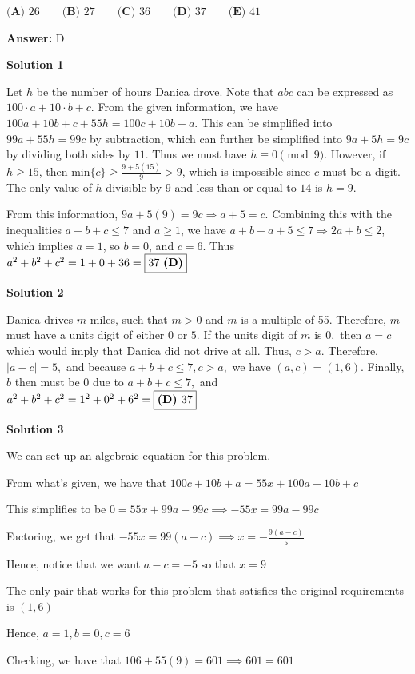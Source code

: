 \begin{enumerate}
 $\textbf {(A) } 26 \qquad \textbf {(B) } 27 \qquad \textbf {(C) } 36 \qquad \textbf {(D) } 37 \qquad \textbf {(E) }41$

 \textbf{Answer: }D



\textbf{Solution 1}

Let $h$ be the number of hours Danica drove. Note that $abc$ can be expressed as $100\cdot a+10\cdot b+c$. From the given information, we have $100a+10b+c+55h=100c+10b+a$. This can be simplified into $99a+55h=99c$ by subtraction, which can further be simplified into $9a+5h=9c$ by dividing both sides by $11$. Thus we must have $h\equiv0\pmod9$. However, if $h\ge 15$, then $\text{min}\{c\}\ge\frac{9+5(15)}{9}>9$, which is impossible since $c$ must be a digit. The only value of $h$ divisible by $9$ and less than or equal to $14$ is $h=9$. 

 From this information, $9a+5(9)=9c\Rightarrow a+5=c$. Combining this with the inequalities $a+b+c\le7$ and $a\ge1$, we have $a+b+a+5\le7\Rightarrow 2a+b\le2$, which implies $a=1$, so $b=0$, and $c=6$. Thus $a^2+b^2+c^2=1+0+36=\fbox{37 \textbf{(D)}}$




\textbf{Solution 2}

Danica drives $m$ miles, such that $m>0$ and $m$ is a multiple of 55. Therefore, $m$ must have a units digit of either $0$ or $5.$ If the units digit of $m$ is $0,$ then $a=c$ which would imply that Danica did not drive at all. Thus, $c>a.$ Therefore, $|a-c|=5,$ and because $a+b+c\leq7, c>a,$ we have $(a,c)=(1,6).$ Finally, $b$ then must be $0$ due to $a+b+c\leq 7,$ and $a^2+b^2+c^2=1^2+0^2+6^2=\fbox{\textbf{(D) }37}$




\textbf{Solution 3}

We can set up an algebraic equation for this problem.

 From what's given, we have that $100c+10b+a=55x+100a+10b+c$

 This simplifies to be $0=55x+99a-99c\implies -55x=99a-99c$

 Factoring, we get that $-55x=99(a-c)\implies x=-\frac{9(a-c)}{5}$

 Hence, notice that we want $a-c=-5$ so that $x=9$

 The only pair that works for this problem that satisfies the original requirements is $(1,6)$

 Hence, $a=1, b=0, c=6$

 Checking, we have that $106+55(9)=601\implies 601=601$


\end{enumerate}
